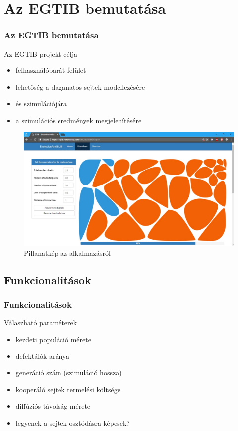 \section{Az EGTIB bemutatása}
\begin{frame}
	\frametitle{Az EGTIB bemutatása}
	\begin{block}{Az EGTIB projekt célja}
		\begin{itemize}
			\item felhasználóbarát felület
			\item lehetőség a daganatos sejtek modellezésére 
			\item és szimulációjára
			\pause
			\item a szimulációs eredmények megjelenítésére
		\end{itemize}
	\end{block}

	\begin{figure}[ht!]
		\centering
		\includegraphics[width=0.6\linewidth]{images/EGTIB.jpg}
		\caption{Pillanatkép az alkalmazásról}
		\label{fig:SimulateWithDiagram}
	\end{figure}
\end{frame}

\subsection{Funkcionalitások}
\begin{frame}
	\frametitle{Funkcionalitások}
	\begin{block}{Válaszható paraméterek}
		\begin{itemize}
			\item kezdeti populáció mérete
			\item defektálók aránya 
			\item generáció szám (szimuláció hossza)
			\item kooperáló sejtek termelési költsége 
			\item diffúziós távolság mérete
			\item legyenek a sejtek osztódásra képesek?
		\end{itemize}
	\end{block}
\end{frame}

